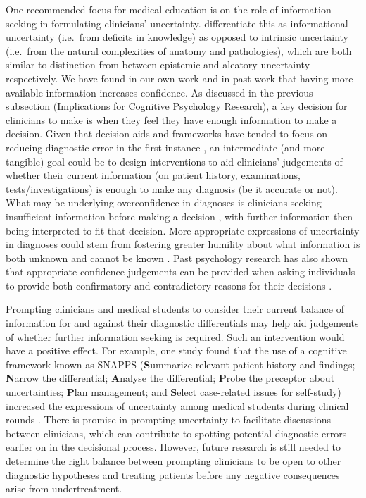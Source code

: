 \documentclass[a4paper, nobind]{templates/ociamthesis}
\begin{document}
One recommended focus for medical education is on the role of information seeking in formulating clinicians' uncertainty. \textcite{wray_diagnosis_2015} differentiate this as informational uncertainty (i.e.~from deficits in knowledge) as opposed to intrinsic uncertainty (i.e.~from the natural complexities of anatomy and pathologies), which are both similar to distinction from \textcite{ülkümen2016} between epistemic and aleatory uncertainty respectively. We have found in our own work and in past work \autocite{gruppen_information_1991,ko_divergent_2022} that having more available information increases confidence. As discussed in the previous subsection (Implications for Cognitive Psychology Research), a key decision for clinicians to make is when they feel they have enough information to make a decision. Given that decision aids and frameworks have tended to focus on reducing diagnostic error in the first instance \autocite{dave_interventions_2022}, an intermediate (and more tangible) goal could be to design interventions to aid clinicians' judgements of whether their current information (on patient history, examinations, tests/investigations) is enough to make any diagnosis (be it accurate or not). What may be underlying overconfidence in diagnoses is clinicians seeking insufficient information before making a decision \autocite{meyer_calibrating_2017}, with further information then being interpreted to fit that decision. More appropriate expressions of uncertainty in diagnoses could stem from fostering greater humility \autocite{fischer_intellectual_2024} about what information is both unknown and cannot be known \autocite{gehlbach_illusion_2024}.
Past psychology research has also shown that appropriate confidence judgements can be provided when asking individuals to provide both confirmatory and contradictory reasons for their decisions \autocite{koriat_reasons_1980}.

\hfill\break
Prompting clinicians and medical students to consider their current balance of information for and against their diagnostic differentials may help aid judgements of whether further information seeking is required. Such an intervention would have a positive effect. For example, one study found that the use of a cognitive framework known as SNAPPS (\textbf{S}ummarize relevant patient history and findings; \textbf{N}arrow the differential; \textbf{A}nalyse the differential; \textbf{P}robe the preceptor about uncertainties; \textbf{P}lan management; and \textbf{S}elect case-related issues for self-study) increased the expressions of uncertainty among medical students during clinical rounds \autocite{wolpaw_student_2012}. There is promise in prompting uncertainty to facilitate discussions between clinicians, which can contribute to spotting potential diagnostic errors earlier on in the decisional process. However, future research is still needed to determine the right balance between prompting clinicians to be open to other diagnostic hypotheses and treating patients before any negative consequences arise from undertreatment.\\
\end{document}
